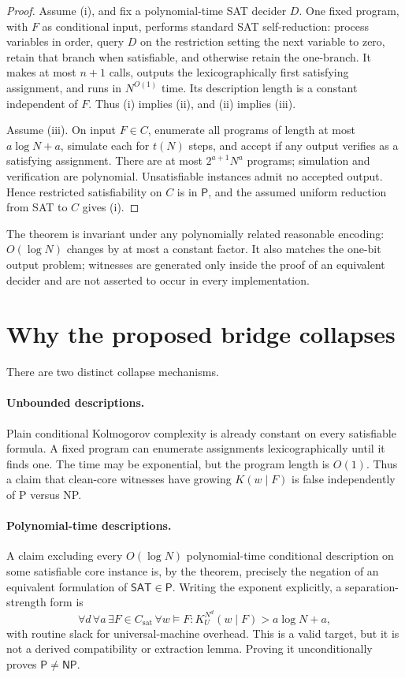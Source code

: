 \documentclass[11pt]{article}
\newcommand{\SAT}{\mathsf{SAT}}
\begin{document}
\begin{proof}
Assume (i), and fix a polynomial-time SAT decider $D$.  One fixed program, with $F$ as conditional input, performs standard SAT self-reduction: process variables in order, query $D$ on the restriction setting the next variable to zero, retain that branch when satisfiable, and otherwise retain the one-branch.  It makes at most $n+1$ calls, outputs the lexicographically first satisfying assignment, and runs in $N^{O(1)}$ time.  Its description length is a constant independent of $F$.  Thus (i) implies (ii), and (ii) implies (iii).

Assume (iii).  On input $F\in C$, enumerate all programs of length at most $a\log N+a$, simulate each for $t(N)$ steps, and accept if any output verifies as a satisfying assignment.  There are at most $2^{a+1}N^a$ programs; simulation and verification are polynomial.  Unsatisfiable instances admit no accepted output.  Hence restricted satisfiability on $C$ is in $\mathsf P$, and the assumed uniform reduction from SAT to $C$ gives (i).
\end{proof}

The theorem is invariant under any polynomially related reasonable encoding: $O(\log N)$ changes by at most a constant factor.  It also matches the one-bit output problem; witnesses are generated only inside the proof of an equivalent decider and are not asserted to occur in every implementation.

\section{Why the proposed bridge collapses}

There are two distinct collapse mechanisms.

\paragraph{Unbounded descriptions.}
Plain conditional Kolmogorov complexity is already constant on every satisfiable formula.  A fixed program can enumerate assignments lexicographically until it finds one.  The time may be exponential, but the program length is $O(1)$.  Thus a claim that clean-core witnesses have growing $K(w\mid F)$ is false independently of P versus NP.

\paragraph{Polynomial-time descriptions.}
A claim excluding every $O(\log N)$ polynomial-time conditional description on some satisfiable core instance is, by the theorem, precisely the negation of an equivalent formulation of $\SAT\in\mathsf P$.  Writing the exponent explicitly, a separation-strength form is
\[
\forall d\,\forall a\,\exists F\in C_{\mathrm{sat}}\,\forall w\models F:
K_U^{N^d}(w\mid F)>a\log N+a,
\]
with routine slack for universal-machine overhead.  This is a valid target, but it is not a derived compatibility or extraction lemma.  Proving it unconditionally proves $\mathsf P\ne\mathsf{NP}$.
\end{document}
